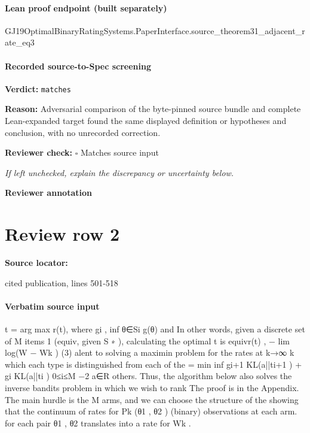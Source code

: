 \documentclass[10pt]{article}
\newcommand{\reviewerbox}{%
  \par\noindent\fbox{\parbox{0.96\linewidth}{\rule{0pt}{0.38in}}}\par
}
\newcommand{\reviewmatch}[1]{%
  \par\noindent\textbf{Reviewer check:} $\square$\; #1\par
  \noindent\emph{If left unchecked, explain the discrepancy or uncertainty below.}\par
}
\begin{document}
\paragraph{Lean proof endpoint (built separately)}\begin{ReviewVerbatim}
GJ19OptimalBinaryRatingSystems.PaperInterface.source_theorem31_adjacent_rate_eq3
\end{ReviewVerbatim}

\paragraph{Recorded source-to-Spec screening}
\textbf{Verdict:} \texttt{matches}
\\
{\raggedright
\textbf{Reason:} Adversarial comparison of the byte-\allowbreak{}pinned source bundle and complete Lean-\allowbreak{}expanded target found the same displayed definition or hypotheses and conclusion, with no unrecorded correction.\allowbreak{}
\par}
\reviewmatch{Matches source input}
\noindent\textbf{Reviewer annotation}\par
\reviewerbox
\clearpage
\hypertarget{source-claim-50a2d9627ea4a9d0}{}
\section*{Review row 2}
\textbf{Source locator:} {\footnotesize\raggedright cited publication, lines 501-\allowbreak{}518\par}
\paragraph{Verbatim source input}
\begin{ReviewVerbatim}
t = arg max r(t), where gi , inf θ∈Si g(θ) and
In other words, given a discrete set of M items
1
(equiv, given S ∗ ), calculating the optimal t is equivr(t) , − lim log(W − Wk )
(3)
alent to solving a maximin problem for the rates at
k→∞ k
which
each type is distinguished from each of the
= min inf {gi+1 KL(a||ti+1 ) + gi KL(a||ti )}
0≤i≤M −2 a∈R
others. Thus, the algorithm below also solves the
inverse bandits problem in which we wish to rank
The proof is in the Appendix. The main hurdle is
the M arms, and we can choose the structure of the
showing that the continuum of rates for Pk (θ1 , θ2 )
(binary) observations at each arm.
for each pair θ1 , θ2 translates into a rate for Wk .
\end{ReviewVerbatim}
\end{document}
